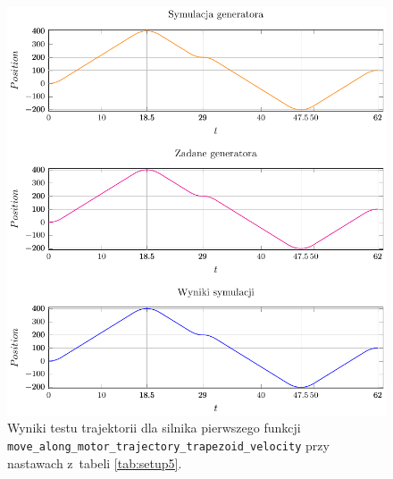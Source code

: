 \documentclass[a4paper, 12pt]{article}
\begin{document}
	\begin{figure}[H]
		\centering
		\includegraphics[scale=1.1]{raport_graphs/simpMTV.pdf}
		\caption{Wyniki testu trajektorii dla silnika pierwszego funkcji \texttt{move\_along\_motor\_trajectory\_trapezoid\_velocity} przy nastawach z~tabeli \ref{tab:setup5}.}
		\label{fig:simpMTV}
	\end{figure}
	
\end{document}
